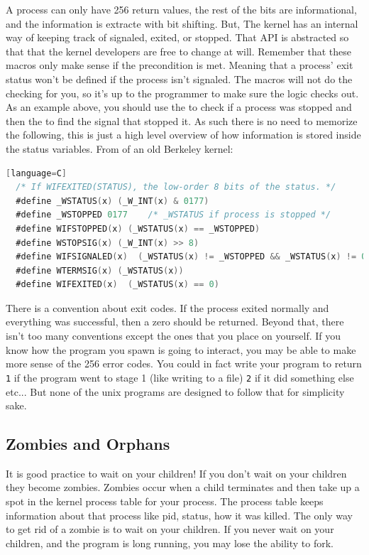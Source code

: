 A process can only have 256 return values, the rest of the bits are informational, and the information is extracte with bit shifting.
But, The kernel has an internal way of keeping track of signaled, exited, or stopped.
That API is abstracted so that that the kernel developers are free to change at will.
Remember that these macros only make sense if the precondition is met.
Meaning that a process' exit status won't be defined if the process isn't signaled.
The macros will not do the checking for you, so it's up to the programmer to make sure the logic checks out.
As an example above, you should use the  to check if a process was stopped and then the  to find the signal that stopped it.
As such there is no need to memorize the following, this is just a high level overview of how information is stored inside the status variables. From  of an old Berkeley kernel\cite{sys/wait.h}:

\begin{lstlisting}[language=C][language=C]
  /* If WIFEXITED(STATUS), the low-order 8 bits of the status. */
  #define _WSTATUS(x) (_W_INT(x) & 0177)
  #define _WSTOPPED 0177    /* _WSTATUS if process is stopped */
  #define WIFSTOPPED(x) (_WSTATUS(x) == _WSTOPPED)
  #define WSTOPSIG(x) (_W_INT(x) >> 8)
  #define WIFSIGNALED(x)  (_WSTATUS(x) != _WSTOPPED && _WSTATUS(x) != 0)
  #define WTERMSIG(x) (_WSTATUS(x))
  #define WIFEXITED(x)  (_WSTATUS(x) == 0)
\end{lstlisting}

There is a convention about exit codes.
If the process exited normally and everything was successful, then a zero should be returned.
Beyond that, there isn't too many conventions except the ones that you place on yourself.
If you know how the program you spawn is going to interact, you may be able to make more sense of the 256 error codes.
You could in fact write your program to return \texttt{1} if the program went to stage 1 (like writing to a file) \texttt{2} if it did something else etc... But none of the unix programs are designed to follow that for simplicity sake.


\subsection{Zombies and Orphans}

It is good practice to wait on your children!
If you don't wait on your children they become zombies.
Zombies occur when a child terminates and then take up a spot in the kernel process table for your process.
The process table keeps information about that process like pid, status, how it was killed.
The only way to get rid of a zombie is to wait on your children.
If you never wait on your children, and the program is long running, you may lose the ability to fork.

